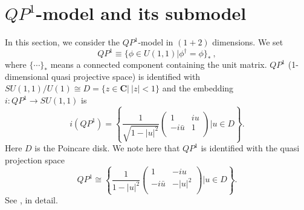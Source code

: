 \documentclass[makeidx,12pt,openany]{report}
\begin{document}
 \section{$QP^1$-model and its submodel}
In this section, we consider the $QP^1$-model in $(1+2)$ dimensions. 
 We set 
\begin{equation}
 QP^1 \equiv \{ \phi \in U(1,1)|\phi^{\dag}=\phi \}_* \ ,
\end{equation}
where $\{ \cdots \}_*$ means a connected component containing the unit matrix. 
$QP^1$ (1-dimensional quasi projective space) is identified with $SU(1,1)/U(1)  \cong D=\{z \in {\mathbf{C}}| \ |z|<1 \} $ and the embedding $i:QP^1 \rightarrow SU(1,1)$ is 
\begin{equation}
 i(QP^1)=\left\{
          \frac{1}{\sqrt{1-|u|^2}}
           \left(
            \begin{array}{cc}
               1     & iu \\
           -i\bar{u} & 1 \\
            \end{array}
           \right)
          |u \in D
         \right\} .
\end{equation}
Here $D$ is the Poincare disk. We note here that $QP^1$ is identified with the quasi projection space 
\begin{equation}
 QP^1 \cong \left\{
             \frac{1}{1-|u|^2}
           \left(
            \begin{array}{cc}
               1     & -iu   \\
           -i\bar{u} &-|u|^2 \\
            \end{array}
           \right)
          |u \in D
         \right\} .
\end{equation}          
See \cite{Fuj}, in detail. 
\end{document}
